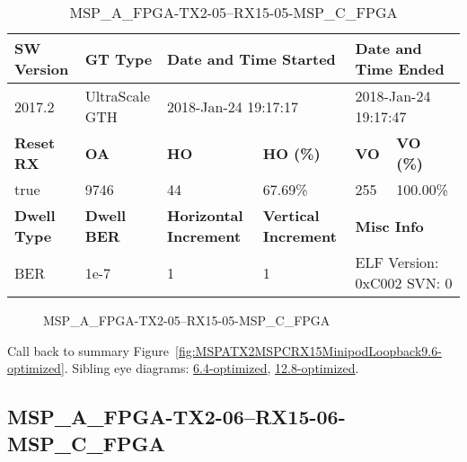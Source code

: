 \begin{table}[h]
\centering
\caption{MSP\_A\_FPGA-TX2-05--RX15-05-MSP\_C\_FPGA}
\label{tab:MSPAFPGATX205RX1505MSPCFPGA9.6-optimized}
\begin{tabular}{@{}|l|l|l|l|l|l|@{}}
\toprule
\textbf{SW Version}                & \textbf{GT Type}   & \multicolumn{2}{l|}{\textbf{Date and Time Started}}            & \multicolumn{2}{l|}{\textbf{Date and Time Ended}}        \\ \midrule
2017.2                       & UltraScale GTH          & \multicolumn{2}{l|}{2018-Jan-24 19:17:17}                   & \multicolumn{2}{l|}{2018-Jan-24 19:17:47}               \\ \midrule
\textbf{Reset RX}                  & \textbf{OA} & \textbf{HO}   & \textbf{HO (\%)} & \textbf{VO} & \textbf{VO (\%)} \\ \midrule
true & 9746        & 44          & 67.69\%        & 255        & 100.00\%       \\ \midrule
\textbf{Dwell Type}                & \textbf{Dwell BER} & \textbf{Horizontal Increment} & \textbf{Vertical Increment}    & \multicolumn{2}{l|}{\textbf{Misc Info}}                  \\ \midrule
BER                            & 1e-7        & 1        & 1           & \multicolumn{2}{l|}{ELF Version: 0xC002 SVN: 0}                         \\ \bottomrule
\end{tabular}
\end{table}

\begin{figure}[h]
\caption{MSP\_A\_FPGA-TX2-05--RX15-05-MSP\_C\_FPGA} \label{fig:MSPAFPGATX205RX1505MSPCFPGA9.6-optimized}
\end{figure}

Call back to summary Figure~\ref{fig:MSPATX2MSPCRX15MinipodLoopback9.6-optimized}.
Sibling eye diagrams: \hyperref[sec:MSPAFPGATX205RX1505MSPCFPGA6.4-optimized]{6.4-optimized}, \hyperref[sec:MSPAFPGATX205RX1505MSPCFPGA12.8-optimized]{12.8-optimized}.

\clearpage
\newpage


\subsection{MSP\_A\_FPGA-TX2-06--RX15-06-MSP\_C\_FPGA}\label{sec:MSPAFPGATX206RX1506MSPCFPGA9.6-optimized}

